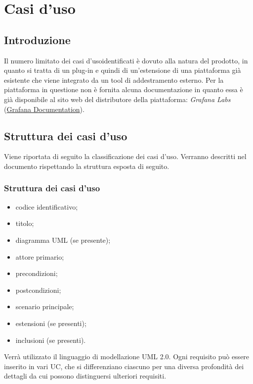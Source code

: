 \section{Casi d'uso}

	\subsection{Introduzione}
Il numero limitato dei casi d'uso\glo identificati è dovuto alla natura del prodotto, in quanto si tratta di un plug-in e quindi di un’estensione di una piattaforma già esistente che viene integrato da un tool di addestramento esterno.
Per la piattaforma in questione non è fornita alcuna documentazione in quanto essa è già disponibile al sito web del distributore della piattaforma: \emph{Grafana Labs} (\href{https://grafana.com/docs/grafana/latest/}{Grafana Documentation}). 

	\subsection{Struttura dei casi d'uso}
Viene riportata di seguito la classificazione dei casi d’uso. Verranno descritti nel documento rispettando la struttura esposta di seguito.
	
		\subsubsection{Struttura dei casi d'uso}
		\begin{itemize}
			\item codice identificativo;
			\item titolo; 
			\item diagramma UML (se presente);
 			\item attore primario; 
			\item precondizioni; 
 			\item postcondizioni; 
 			\item scenario principale; 
 			\item estensioni (se presenti);
			\item inclusioni (se presenti).
 		\end{itemize}
Verrà utilizzato il linguaggio di modellazione UML 2.0\glo. 
Ogni requisito può essere inserito in vari UC\glo, che si differenziano ciascuno per una diversa profondità dei dettagli da cui possono distinguersi ulteriori requisiti. 

